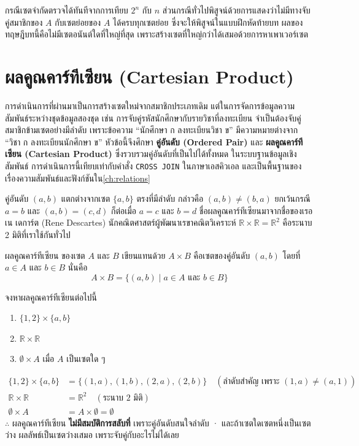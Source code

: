 กรณีเซตจำกัดตรวจได้ทันทีจากการเทียบ $2^n$ กับ $n$ ส่วนกรณีทั่วไปพิสูจน์ด้วยการแสดงว่าไม่มีทางจับคู่สมาชิกของ $A$ กับเซตย่อยของ $A$ ได้ครบทุกเซตย่อย ซึ่งจะให้พิสูจน์ในแบบฝึกหัดท้ายบท ผลของทฤษฎีบทนี้คือไม่มีเซตอนันต์ใดที่ใหญ่ที่สุด เพราะสร้างเซตที่ใหญ่กว่าได้เสมอด้วยการหาเพาเวอร์เซต


\section{ผลคูณคาร์ทีเซียน (Cartesian Product)}
\label{sec:cartesian-product}

การดำเนินการที่ผ่านมาเป็นการสร้างเซตใหม่จากสมาชิกประเภทเดิม แต่ในการจัดการข้อมูลความสัมพันธ์ระหว่างชุดข้อมูลสองชุด เช่น การจับคู่รหัสนักศึกษากับรายวิชาที่ลงทะเบียน จำเป็นต้องจับคู่สมาชิกข้ามเซตอย่างมีลำดับ เพราะข้อความ ``นักศึกษา ก ลงทะเบียนวิชา ข'' มีความหมายต่างจาก ``วิชา ก ลงทะเบียนนักศึกษา ข'' หัวข้อนี้จึงศึกษา \textbf{คู่อันดับ (Ordered Pair)} และ \textbf{ผลคูณคาร์ทีเซียน (Cartesian Product)} ซึ่งรวบรวมคู่อันดับที่เป็นไปได้ทั้งหมด ในระบบฐานข้อมูลเชิงสัมพันธ์ การดำเนินการนี้เทียบเท่ากับคำสั่ง \texttt{CROSS JOIN} ในภาษาเอสคิวเอล และเป็นพื้นฐานของเรื่องความสัมพันธ์และฟังก์ชันใน\autoref{ch:relations}

คู่อันดับ $(a, b)$ แตกต่างจากเซต $\{a, b\}$ ตรงที่มีลำดับ กล่าวคือ $(a, b) \neq (b, a)$ ยกเว้นกรณี $a = b$ และ $(a, b) = (c, d)$ ก็ต่อเมื่อ $a = c$ และ $b = d$ ชื่อผลคูณคาร์ทีเซียนมาจากชื่อของเรอเน เดการ์ต (Rene Descartes) นักคณิตศาสตร์ผู้พัฒนาเรขาคณิตวิเคราะห์ $\mathbb{R} \times \mathbb{R} = \mathbb{R}^2$ คือระนาบ 2 มิติที่เราใช้กันทั่วไป~\parencite{lipschutz1998settheory}

\begin{definition}
ผลคูณคาร์ทีเซียน ของเซต $A$ และ $B$ เขียนแทนด้วย $A \times B$ คือเซตของคู่อันดับ $(a, b)$ โดยที่ $a \in A$ และ $b \in B$ นั่นคือ
\[ A \times B = \{(a, b) \mid a \in A \text{ และ } b \in B\} \]
\end{definition}

\begin{ex}
\label{ex:cartesian-product}
จงหาผลคูณคาร์ทีเซียนต่อไปนี้
\begin{enumerate}
    \item $\{1, 2\} \times \{a, b\}$
    \item $\mathbb{R} \times \mathbb{R}$
    \item $\emptyset \times A$ เมื่อ $A$ เป็นเซตใด ๆ
\end{enumerate}
\end{ex}
\begin{solution}
\begin{align*}
\{1,2\} \times \{a,b\} &= \{(1,a),(1,b),(2,a),(2,b)\} \quad (\text{ลำดับสำคัญ เพราะ } (1,a) \neq (a,1))\\
\mathbb{R} \times \mathbb{R} &= \mathbb{R}^2 \quad (\text{ระนาบ 2 มิติ})\\
\emptyset \times A &= A \times \emptyset = \emptyset
\end{align*}
$\therefore$ ผลคูณคาร์ทีเซียน \textbf{ไม่มีสมบัติการสลับที่} เพราะคู่อันดับสนใจลำดับ · และถ้าเซตใดเซตหนึ่งเป็นเซตว่าง ผลลัพธ์เป็นเซตว่างเสมอ เพราะจับคู่กับอะไรไม่ได้เลย \solhere
\end{solution}

